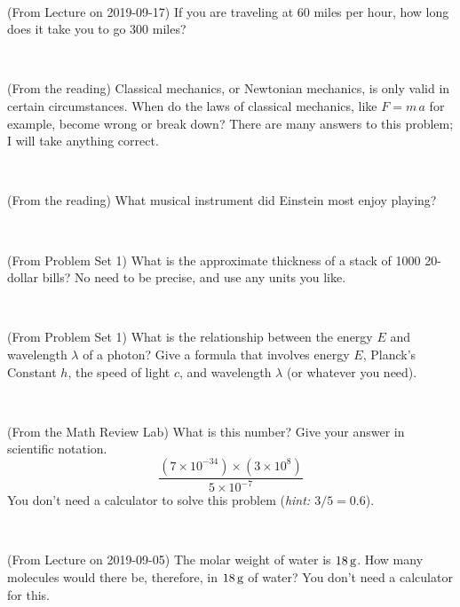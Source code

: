 \documentclass[12pt, letterpaper]{article}
\begin{document}
\vfill ~

\begin{problem} (From Lecture on 2019-09-17)
If you are traveling at 60 miles per hour, how long does
it take you to go 300 miles?
\end{problem}


\vfill ~

\begin{problem} (From the reading)
Classical mechanics, or Newtonian mechanics, is only valid in certain
circumstances. When do the laws of classical mechanics, like $F =
m\,a$ for example, become wrong or break down? There are many answers
to this problem; I will take anything correct.
\end{problem}


\vfill ~

\begin{problem} (From the reading)
What musical instrument did Einstein most enjoy playing?
\end{problem}


\vfill ~


\clearpage


\begin{problem} (From Problem Set 1)
What is the approximate thickness of a stack of 1000 20-dollar bills?
No need to be precise, and use any units you like.
\end{problem}


\vfill ~

\begin{problem} (From Problem Set 1)
What is the relationship between the energy $E$ and wavelength
$\lambda$ of a photon? Give a formula that involves energy $E$,
Planck's Constant $h$, the speed of light $c$, and wavelength
$\lambda$ (or whatever you need).
\end{problem}

\vfill ~

\begin{problem} (From the Math Review Lab)
What is this number? Give your answer in scientific notation.
$$
\frac{(7\times10^{-34})\times(3\times10^8)}{5\times10^{-7}}
$$
You don't need a calculator to solve this problem (\textit{hint: $3/5=0.6$}).
\end{problem}


\vfill ~

\begin{problem} (From Lecture on 2019-09-05)
The molar weight of water is $18\,\mathrm{g}$. How many molecules would there
be, therefore, in $18\,\mathrm{g}$ of water? You don't need a calculator for
this.
\end{problem}
\end{document}
